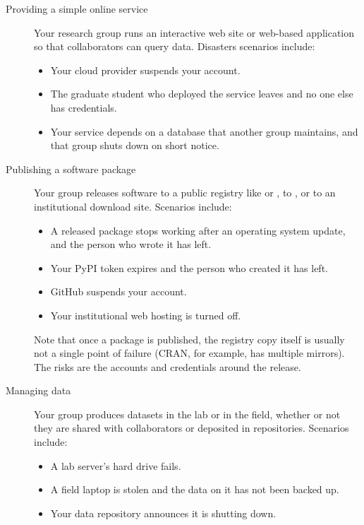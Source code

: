 \documentclass[10pt,letterpaper]{article}
\begin{document}
\begin{description}
  
\item[Providing a simple online service]
  Your research group runs an interactive web site or web-based application
  so that collaborators can query data.
  Disasters scenarios include:
  \begin{itemize}
  \item Your cloud provider suspends your account.
  \item The graduate student who deployed the service leaves and no one else has credentials.
  \item Your service depends on a database that another group maintains,
    and that group shuts down on short notice.
  \end{itemize}
  
\item[Publishing a software package]
  Your group releases software to a public registry like
   or ,
  to , or to an institutional download site.
  Scenarios include:
  \begin{itemize}
  \item A released package stops working after an operating system update, and
    the person who wrote it has left.
  \item Your PyPI token expires and the person who created it has left.
  \item GitHub suspends your account.
  \item Your institutional web hosting is turned off.
  \end{itemize}
  Note that once a package is published, the registry copy itself is usually not
  a single point of failure (CRAN, for example, has multiple mirrors).  The
  risks are the accounts and credentials around the release.
  
\item[Managing data]
  Your group produces datasets in the lab or in the field, whether or not they
  are shared with collaborators or deposited in repositories.  Scenarios include:
  \begin{itemize}
  \item A lab server's hard drive fails.
  \item A field laptop is stolen and the data on it has not been backed up.
  \item Your data repository announces it is shutting down.
  \end{itemize}
  
\end{description}
\end{document}
